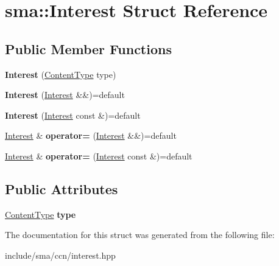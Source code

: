 \hypertarget{structsma_1_1Interest}{\section{sma\-:\-:Interest Struct Reference}
\label{structsma_1_1Interest}
}
\subsection*{Public Member Functions}
\begin{DoxyCompactItemize}
\item 
\hypertarget{structsma_1_1Interest_a32c072b20451f0d78b11ec1415d0e3c8}{{\bfseries Interest} (\hyperlink{structsma_1_1ContentType}{Content\-Type} type)}\label{structsma_1_1Interest_a32c072b20451f0d78b11ec1415d0e3c8}

\item 
\hypertarget{structsma_1_1Interest_a86fdcf47783f210993629fc5b2b2e32d}{{\bfseries Interest} (\hyperlink{structsma_1_1Interest}{Interest} \&\&)=default}\label{structsma_1_1Interest_a86fdcf47783f210993629fc5b2b2e32d}

\item 
\hypertarget{structsma_1_1Interest_a50cc4925a16dc265d60965da7cd43a5e}{{\bfseries Interest} (\hyperlink{structsma_1_1Interest}{Interest} const \&)=default}\label{structsma_1_1Interest_a50cc4925a16dc265d60965da7cd43a5e}

\item 
\hypertarget{structsma_1_1Interest_ae726a0d500c73e434ef0d125de397053}{\hyperlink{structsma_1_1Interest}{Interest} \& {\bfseries operator=} (\hyperlink{structsma_1_1Interest}{Interest} \&\&)=default}\label{structsma_1_1Interest_ae726a0d500c73e434ef0d125de397053}

\item 
\hypertarget{structsma_1_1Interest_a8264b905ae77af644088108f75043854}{\hyperlink{structsma_1_1Interest}{Interest} \& {\bfseries operator=} (\hyperlink{structsma_1_1Interest}{Interest} const \&)=default}\label{structsma_1_1Interest_a8264b905ae77af644088108f75043854}

\end{DoxyCompactItemize}
\subsection*{Public Attributes}
\begin{DoxyCompactItemize}
\item 
\hypertarget{structsma_1_1Interest_a6fff65de0121419e16e0865bf623d00c}{\hyperlink{structsma_1_1ContentType}{Content\-Type} {\bfseries type}}\label{structsma_1_1Interest_a6fff65de0121419e16e0865bf623d00c}

\end{DoxyCompactItemize}


The documentation for this struct was generated from the following file\-:\begin{DoxyCompactItemize}
\item 
include/sma/ccn/interest.\-hpp\end{DoxyCompactItemize}

